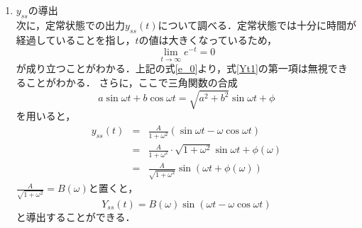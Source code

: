 \documentclass[a4paper,11pt]{jsarticle}
\begin{document}
\begin{enumerate}
\begin{equation}
\begin{aligned}
            & b + c = 0 \\
            & a\omega^2 + c = A\omega
            \end{aligned}
        \right.
        \label{abc}
      \end{equation}
      式\ref{abc}を解くと，$a=\frac{A\omega}{\omega^2+1}$，$b=-\frac{A\omega}{\omega^2+1}$，$\frac{A\omega}{\omega^2+1}$
      となる．よって$Y(s)$は，
      \begin{equation}
        Y(s) = \frac{A\omega}{(\omega^2+1)(s+1)} - \frac{A\omega s}{(\omega^2+1)(s^2+\omega^2)} + \frac{A\omega}{(\omega^2+1)(s^2+\omega^2)} \label{Ys3}
      \end{equation}
      式\ref{Ys3}を逆ラプラス変換を用いて$y(t)$の式に変換すると，
      \begin{eqnarray}
        y(t) &=& \mathcal{L}^{-1}[Y(s)] = \mathcal{L}^{-1}\left[\frac{A\omega}{(\omega^2+1)(s+1)}\right]-\mathcal{L}^{-1}\left[\frac{A\omega s}{(\omega^2+1)(s^2+\omega^2)}\right] + \mathcal{L}^{-1}\left[\frac{A\omega}{(\omega^2+1)(s^2+\omega^2)}\right] \nonumber \\ 
            &=&  \frac{A\omega}{\omega^2+1}\cdot e^{-t} - \frac{A\omega}{\omega^2+1}\cdot \cos{\omega t} + \frac{A}{\omega^2 + 1} \cdot \sin{\omega t} \nonumber \\ 
            &=& \frac{A\omega}{\omega^2+1}\cdot e^{-t} + \frac{A}{1+\omega^2}(\sin{\omega t}-\omega\cos{\omega t}) \label{Yt1}
      \end{eqnarray}
    
    \item $y_{ss}$の導出\\
      次に，定常状態での出力$y_{ss}(t)$について調べる．定常状態では十分に時間が経過していることを指し，$t$の値は大きくなっているため，
      \begin{equation}
        \lim_{t\rightarrow\infty}e^{-t}=0 \label{e_0}
      \end{equation}
      が成り立つことがわかる．上記の式\ref{e_0}より，式\ref{Yt1}の第一項は無視できることがわかる．
      さらに，ここで三角関数の合成
      \begin{equation}
        a\sin{\omega t}+b\cos{\omega t} = \sqrt{a^2+b^2}\sin{\omega t + \phi} \nonumber
      \end{equation}
      を用いると，
      \begin{eqnarray}
        y_{ss}(t) &=& \frac{A}{1+\omega^2}(\sin{\omega t}-\omega\cos{\omega t}) \nonumber \\
                  &=& \frac{A}{1+\omega^2} \cdot \sqrt{1+\omega^2}\sin{\omega t + \phi(\omega)} \nonumber \\
                  &=& \frac{A}{\sqrt{1+\omega^2}}\sin({\omega t + \phi(\omega)})
      \end{eqnarray}
      $\frac{A}{\sqrt{1+\omega^2}} = B(\omega)$と置くと，
      \begin{equation}
        Y_{ss}(t) = B(\omega)\sin{(\omega t - \omega \cos{\omega t})}
      \end{equation}
      と導出することができる．
    

\end{enumerate}
\end{document}
